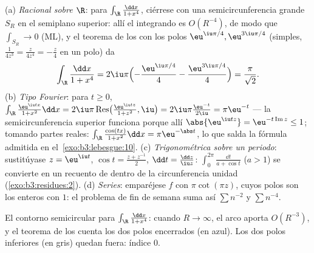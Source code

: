 \begin{example}
\label{ex:b3:residues:integrals}
(a) \emph{Racional sobre $\R$}: para $\int_\R\frac{\dd x}{1 +
x^4}$, ciérrese con una semicircunferencia grande $S_R$ en el semiplano
superior: allí el integrando es $O(R^{-4})$, de modo que
$\int_{S_R} \to 0$ (ML), y el teorema de los
 con los polos
$\eu^{\iu\pi/4}, \eu^{3\iu\pi/4}$ (simples,
$\frac1{4z^3} = \frac{z}{4z^4} = -\frac z4$ en un polo) da
\[
\int_\R\frac{\dd x}{1 + x^4}
= 2\iu\pi\Bigl(-\frac{\eu^{\iu\pi/4}}4 -
\frac{\eu^{3\iu\pi/4}}4\Bigr)
= \frac{\pi}{\sqrt2} .
\]
(b) \emph{Tipo Fourier}: para $t \geq 0$,
$\int_\R\frac{\eu^{\iu tx}}{1 + x^2}\dd x =
2\iu\pi\operatorname{Res}\bigl(\tfrac{\eu^{\iu tz}}{1+z^2},
\iu\bigr) = 2\iu\pi\frac{\eu^{-t}}{2\iu} = \pi\eu^{-t}$ ---
la semicircunferencia superior funciona porque allí
$\abs{\eu^{\iu tz}} =
\eu^{-t\operatorname{Im}z} \leq 1$; tomando partes reales:
$\int_\R\frac{\cos(tx)}{1+x^2}\dd x = \pi\eu^{-\abs t}$,
lo que salda la fórmula admitida en el~\cref{exo:b3:lebesgue:10}. (c)
\emph{Trigonométrica sobre un periodo}: sustitúyase $z =
\eu^{\iu t}$, $\cos t = \frac{z + z^{-1}}2$, $\dd t =
\frac{\dd z}{\iu z}$: $\int_0^{2\pi}\frac{\dd t}{a + \cos t}$ ($a > 1$)
se convierte en un recuento de
 dentro de la
circunferencia unidad
(\cref{exo:b3:residues:2}).
(d) \emph{Series}: emparéjese $f$ con $\pi\cot(\pi z)$, cuyos polos son
los enteros con  $1$: el
problema de fin de semana suma así $\sum n^{-2}$ y $\sum n^{-4}$.
\end{example}

\begin{omfigure}

{\small El contorno semicircular para $\int_\R\frac{\dd x}{1 +
x^4}$: cuando $R \to \infty$, el arco aporta $O(R^{-3})$, y el teorema
de los  cuenta los dos
polos encerrados (en azul). Los dos polos inferiores (en gris) quedan
fuera: índice $0$.}
\end{omfigure}

